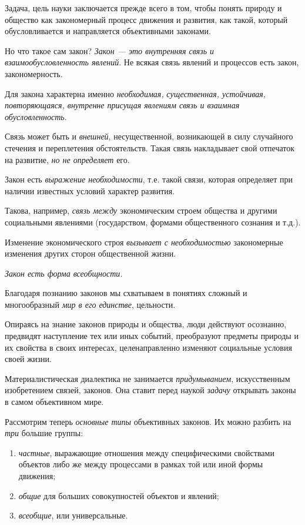 \documentclass[a4paper,14pt,russian]{extreport}
\begin{document}
Задача, цель науки заключается прежде всего в том, чтобы понять природу и общество как закономерный процесс движения и развития, как такой, который обусловливается и направляется объективными законами.

Но что такое сам закон? \emph{Закон --- это внутренняя связь и взаимообусловленность явлений}. Не всякая связь явлений и процессов есть закон, закономерность.

Для закона характерна именно \emph{необходимая,} \emph{существенная, устойчивая, повторяющаяся, внутренне присущая явлениям связь и взаимная обусловленность}.

Связь может быть и \emph{внешней}, несущественной, возникающей в силу случайного стечения и переплетения обстоятельств. Такая связь накладывает свой отпечаток на развитие, \emph{но не определяет} его.

Закон есть \emph{выражение необходимости}, т.е. такой связи, которая определяет при наличии известных условий характер развития.

Такова, например, \emph{связь между} экономическим строем общества и другими социальными явлениями (государством, формами общественного сознания и т.д.).

Изменение экономического строя \emph{вызывает с необходимостью} закономерные изменения других сторон общественной жизни.

\emph{Закон есть форма всеобщности.}

Благодаря познанию законов мы схватываем в понятиях сложный и многообразный \emph{мир в его единстве}, цельности.

Опираясь на знание законов природы и общества, люди действуют осознанно, предвидят наступление тех или иных событий, преобразуют предметы природы и их свойства в своих интересах, целенаправленно изменяют социальные условия своей жизни.

Материалистическая диалектика не занимается \emph{придумыванием}, искусственным изобретением связей, законов. Она ставит перед наукой \emph{задачу} открывать законы в самом объективном мире.

Рассмотрим теперь \emph{основные типы} объективных законов. Их можно разбить на \emph{три} большие группы:

\begin{enumerate}
\item \emph{частные}, выражающие отношения между специфическими свойствами объектов либо же между процессами в рамках той или иной формы движения;
\item \emph{общие} для больших совокупностей объектов и явлений;
\item \emph{всеобщие}, или универсальные.
\end{enumerate}
\end{document}
